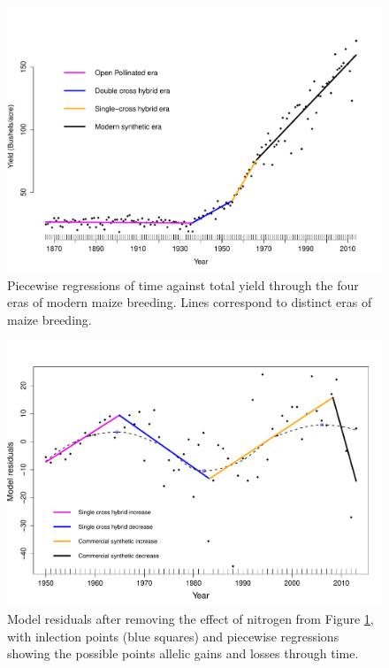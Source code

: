 \documentclass[12pt]{article}
\begin{document}
\begin{figure}[ht]
\includegraphics[width=1.0\linewidth]{yield.pdf}
\caption{Piecewise regressions of time against total yield through the four eras of modern maize breeding. Lines correspond to distinct eras of maize breeding.} 
\label{fig:piecewise}
\end{figure}

\begin{figure}[ht]
\includegraphics[width=1.0\linewidth]{inflection_point.pdf}
\caption{Model residuals after removing the effect of nitrogen from Figure \ref{fig:piecewise}, with inlection points (blue squares) and piecewise regressions showing the possible points allelic gains and losses through time.} 
\label{fig:inflection}
\end{figure}
\end{document}
